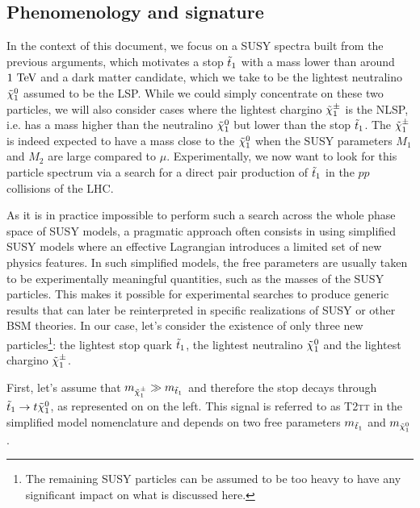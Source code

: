     \subsection{Phenomenology and signature \label{sec:phenoAndSignature}}

    In the context of this document, we focus on a SUSY spectra built from the
    previous arguments, which motivates a stop $\tilde{t}_1$ with a mass lower than
    around $1~\text{TeV}$ and a dark matter candidate, which we take to be the lightest
    neutralino $\tilde{\chi}_1^0$ assumed to be the LSP. While we could simply
    concentrate on these two particles, we will also consider cases where the
    lightest chargino $\tilde{\chi}_1^\pm$ is the NLSP, i.e. has a mass higher than the
    neutralino $\tilde{\chi}_1^0$ but lower than the stop $\tilde{t}_1$. The $\tilde{\chi}_1^\pm$
    is indeed expected to have a mass close to the $\tilde{\chi}_1^0$ when the SUSY
    parameters $M_1$ and $M_2$ are large compared to $\mu$. Experimentally, we
    now want to look for this particle spectrum via a search for a direct pair
    production of $\tilde{t}_1$ in the $pp$ collisions of the LHC.

    As it is in practice impossible to perform such a search across the whole
    phase space of SUSY models, a pragmatic approach often consists in using
    simplified SUSY models where an effective Lagrangian introduces a limited
    set of new physics features. In such simplified models, the free parameters
    are usually taken to be experimentally meaningful quantities, such as the
    masses of the SUSY particles. This makes it possible for experimental
    searches to produce generic results that can later be reinterpreted in
    specific realizations of SUSY \cite{LiemSMS, SmodelS} or other BSM theories.
    In our case, let's consider the existence of only three new
    particles\footnote{The remaining SUSY particles can be assumed to be too
    heavy to have any significant impact on what is discussed here.}: the
    lightest stop quark $\tilde{t}_1$, the lightest neutralino $\tilde{\chi}_1^0$ and the
    lightest chargino $ \tilde{\chi}_1^\pm$.

    First, let's assume that $m_{\tilde{\chi}_1^\pm} \gg m_{\tilde{t}_1}$ and therefore
    the stop decays through $\tilde{t}_1 \rightarrow t \tilde{\chi}_1^0$, as represented
    on  on the left. This signal is referred to as
    \textsc{T2tt} in the simplified model nomenclature and depends on two free
    parameters $m_{\tilde{t}_1}$ and $m_{\tilde{\chi}_1^0}$.

